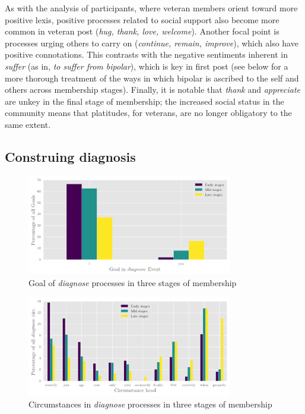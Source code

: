 \documentclass{article}
\begin{document}
As with the analysis of participants, where veteran members orient toward more positive lexis, positive processes related to social support also become more common in veteran post (\emph{hug, thank, love, welcome}). Another focal point is processes urging others to carry on (\emph{continue, remain, improve}), which also have positive connotations. This contrasts with the negative sentiments inherent in \emph{suffer} (as in, \emph{to suffer from bipolar}), which is key in first post (see below for a more thorough treatment of the ways in which bipolar is ascribed to the self and others across membership stages). Finally, it is notable that \emph{thank} and \emph{appreciate} are unkey in the final stage of membership; the increased social status in the community means that platitudes, for veterans, are no longer obligatory to the same extent.

\subsection{Construing diagnosis} \label{sect:diag}


\begin{figure}[htb]
    \centering
    \includegraphics[width=0.8\textwidth]{images/goal-in-diag-ev.png}
    \caption[Goal of \emph{diagnose} processes]{Goal of \emph{diagnose} processes in three stages of membership}
    \label{fig:part_in_diag}
    \end{figure}

    \begin{figure}[htb]
    \centering
    \includegraphics[width=0.8\textwidth]{images/diag-circ.png}
    \caption[Circumstances in \emph{diagnose} processes]{Circumstances in \emph{diagnose} processes in three stages of membership}
    \label{fig:circ_in_diag}
    \end{figure}
\end{document}
